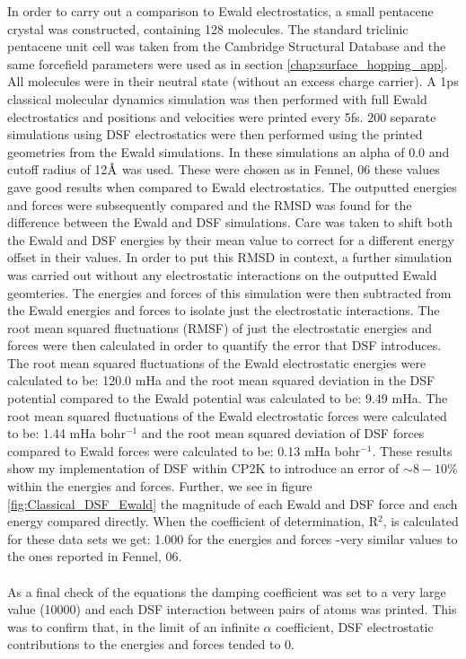 In order to carry out a comparison to Ewald electrostatics, a small pentacene crystal was constructed, containing 128 molecules. The standard triclinic pentacene unit cell was taken from the Cambridge Structural Database \cite{CSD} and the same forcefield parameters were used as in section \ref{chap:surface_hopping_app}. All molecules were in their neutral state (without an excess charge carrier). A 1ps classical molecular dynamics simulation was then performed with full Ewald electrostatics and positions and velocities were printed every 5fs. 200 separate simulations using DSF electrostatics were then performed using the printed geometries from the Ewald simulations. In these simulations an alpha of 0.0 and cutoff radius of 12$\text{\normalfont\AA}$ was used. These were chosen as in Fennel, 06 \cite{DSF} these values gave good results when compared to Ewald electrostatics. The outputted energies and forces were subsequently compared and the RMSD was found for the difference between the Ewald and DSF simulations. Care was taken to shift both the Ewald and DSF energies by their mean value to correct for a different energy offset in their values. In order to put this RMSD in context, a further simulation was carried out without any electrostatic interactions on the outputted Ewald geomteries. The energies and forces of this simulation were then subtracted from the Ewald energies and forces to isolate just the electrostatic interactions. The root mean squared fluctuations (RMSF) of just the electrostatic energies and forces were then calculated in order to quantify the error that DSF introduces. The root mean squared fluctuations of the Ewald electrostatic energies were calculated to be: 120.0 mHa and the root mean squared deviation in the DSF potential compared to the Ewald potential was calculated to be: 9.49 mHa. The root mean squared fluctuations of the Ewald electrostatic forces were calculated to be: 1.44 mHa bohr$^{-1}$ and the root mean squared deviation of DSF forces compared to Ewald forces were calculated to be: 0.13 mHa bohr$^{-1}$. These results show my implementation of DSF within CP2K to introduce an error of $\sim 8-10$\% within the energies and forces. Further, we see in figure \ref{fig:Classical_DSF_Ewald} the magnitude of each Ewald and DSF force and each energy compared directly. When the coefficient of determination, R$^2$, is calculated for these data sets we get: 1.000 for the energies and forces -very similar values to the ones reported in Fennel, 06.
\\\\
As a final check of the equations the damping coefficient was set to a very large value (10000) and each DSF interaction between pairs of atoms was printed. This was to confirm that, in the limit of an infinite $\alpha$ coefficient, DSF electrostatic contributions to the energies and forces tended to 0. 
